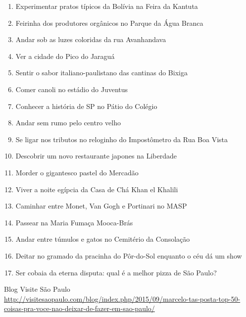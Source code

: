 \documentclass[extrafontsizes,14pt]{memoir}
\begin{document}
\begin{enumerate}
\item Experimentar pratos típicos da Bolívia na Feira da Kantuta

\item Feirinha dos produtores orgânicos no Parque da Água Branca

\item Andar sob as luzes coloridas da rua Avanhandava

\item Ver a cidade do Pico do Jaraguá

\item Sentir o sabor italiano-paulistano das cantinas do Bixiga

\item Comer canoli no estádio do Juventus

\item Conhecer a história de SP no Pátio do Colégio

\item Andar sem rumo pelo centro velho

\item Se ligar nos tributos no reloginho do Impostômetro da Rua Boa Vista

\item Descobrir um novo restaurante japones na Liberdade

\item Morder o gigantesco pastel do Mercadão

\item Viver a noite egípcia da Casa de Chá Khan el Khalili

\item Caminhar entre Monet, Van Gogh e Portinari no MASP

\item Passear na Maria Fumaça Mooca-Brás

\item Andar entre túmulos e gatos no Cemitério da Consolação

\item Deitar no gramado da pracinha do Pôr-do-Sol enquanto o céu dá um show

\item Ser cobaia da eterna disputa: qual é a melhor pizza de São Paulo?

\end{enumerate}

\vspace*{3cm} 

Blog Visite São Paulo\\

{\small %
\url{http://visitesaopaulo.com/blog/index.php/2015/09/marcelo-tas-posta-top-50-coisas-pra-voce-nao-deixar-de-fazer-em-sao-paulo/}}
\end{document}
